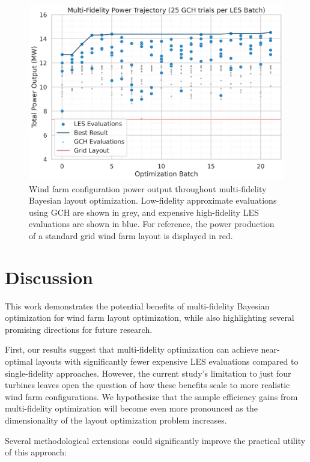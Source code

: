 \documentclass[11pt]{article}
\begin{document}
\begin{figure}[htbp]
    \centering
    \includegraphics[scale=0.5]{../campaigns/mf_alternating/power_trajectory.png}
    \caption{Wind farm configuration power output throughout multi-fidelity
    Bayesian layout optimization. Low-fidelity approximate evaluations using
    GCH are shown in grey, and expensive high-fidelity LES evaluations are shown in blue.
    For reference, the power production of a standard grid wind farm layout is
    displayed in red.
    }
    \label{fig:multi_fidelity_power_trajectory}
\end{figure}

\section{Discussion}
This work demonstrates the potential benefits of multi-fidelity Bayesian
optimization for wind farm layout optimization, while also highlighting several
promising directions for future research.

First, our results suggest that multi-fidelity optimization can achieve
near-optimal layouts with significantly fewer expensive LES evaluations
compared to single-fidelity approaches. However, the current study's limitation
to just four turbines leaves open the question of how these benefits scale to
more realistic wind farm configurations. We hypothesize that the sample
efficiency gains from multi-fidelity optimization will become even more
pronounced as the dimensionality of the layout optimization problem increases.

Several methodological extensions could significantly improve the practical
utility of this approach:
\end{document}
